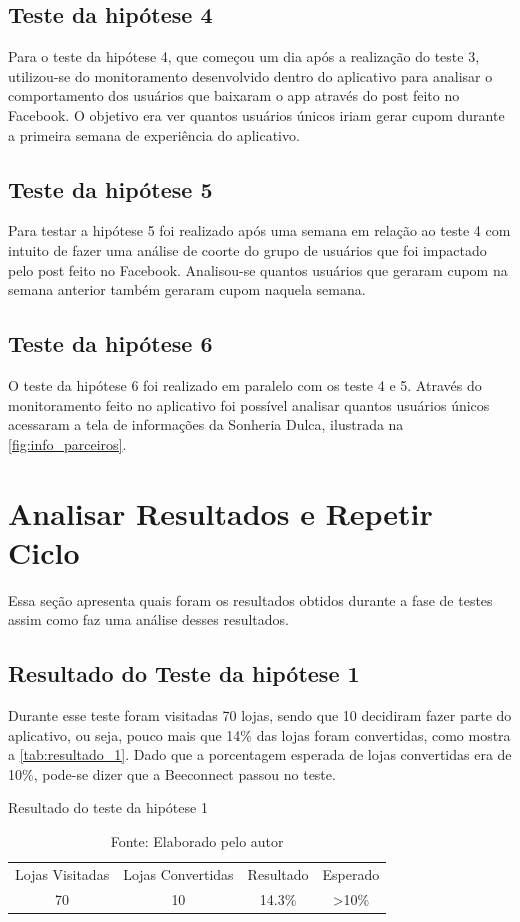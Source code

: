 \subsection{Teste da hipótese 4}
\label{cha:teste_4}
Para o teste da hipótese 4, que começou um dia após a realização do teste 3, utilizou-se do monitoramento desenvolvido dentro do aplicativo para analisar o comportamento dos usuários que baixaram o app através do post feito no Facebook. O objetivo era ver quantos usuários únicos iriam gerar cupom durante a primeira semana de experiência do aplicativo.

\subsection{Teste da hipótese 5}
\label{cha:teste_5}
Para testar a hipótese 5 foi realizado após uma semana em relação ao teste 4 com intuito de fazer uma análise de coorte do grupo de usuários que foi impactado pelo post feito no Facebook. Analisou-se quantos usuários que geraram cupom na semana anterior também geraram cupom naquela semana.

\subsection{Teste da hipótese 6}
\label{cha:teste_6}
O teste da hipótese 6 foi realizado em paralelo com os teste 4 e 5. Através do monitoramento feito no aplicativo foi possível analisar quantos usuários únicos acessaram a tela de informações da Sonheria Dulca, ilustrada na \autoref{fig:info_parceiros}.

\section{Analisar Resultados e Repetir Ciclo}
\label{cha:analisar_resultados}
Essa seção apresenta quais foram os resultados obtidos durante a fase de testes assim como faz uma análise desses resultados.

\subsection{Resultado do Teste da hipótese 1}
\label{cha:resultado_1}
Durante esse teste foram visitadas 70 lojas, sendo que 10 decidiram fazer parte do aplicativo, ou seja, pouco mais que 14\% das lojas foram convertidas, como mostra a \autoref{tab:resultado_1}. Dado que a porcentagem esperada de lojas convertidas era de 10\%, pode-se dizer que a Beeconnect passou no teste.
\begin{table}[H]
\centering
\caption{Resultado do teste da hipótese 1}
\label{tab:resultado_1}
\begin{tabular}{cccc}
Lojas Visitadas & Lojas Convertidas & Resultado & Esperado          \\
70                        & 10                          & 14.3\%      & \textgreater 10\%
\end{tabular}
\caption* {Fonte: Elaborado pelo autor}    
\end{table}

